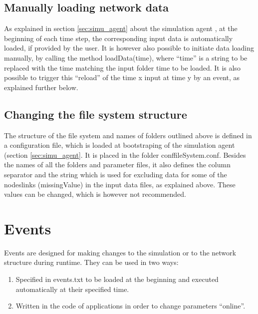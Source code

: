 \documentclass[11pt,fleqn]{book} %
\newcommand{\mainagent}{simulation agent }
\begin{document}
\subsection{Manually loading network data}
As explained in section \ref{sec:simu_agent} about the \mainagent, at the beginning of each time step, the corresponding input data is automatically loaded, if provided by the user. It is however also possible to initiate data loading manually, by calling the method loadData(time), where “time” is a string to be replaced with the time matching the input folder time to be loaded. It is also possible to trigger this “reload” of the time x input at time y by an event, as explained further below.

\subsection{Changing the file system structure}
The structure of the file system and names of folders outlined above is defined in a configuration file, which is loaded at bootstraping of the \mainagent (section \ref{sec:simu_agent}. It is placed in the folder conf\/fileSystem.conf. Besides the names of all the folders and parameter files, it also defines the column separator and the string which is used for excluding data for some of the nodes\/links (missingValue) in the input data files, as explained above. These values can be changed, which is however not recommended.


\section{Events}\label{sec:events}
Events are designed for making changes to the simulation or to the network structure during runtime. They can be used in two ways:
\begin{enumerate}
	\item Specified in events.txt to be loaded at the beginning and executed automatically at their specified time. 
	\item Written in the code of applications in order to change parameters “online”.
\end{enumerate}
\end{document}
